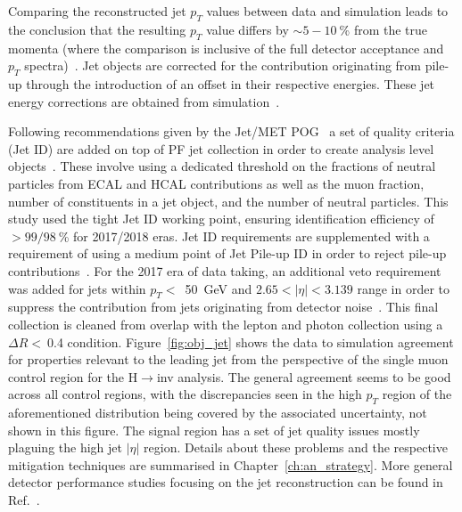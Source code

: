 \hspace{10pt} Comparing the reconstructed jet $p_T$ values between data and simulation leads to the conclusion that the resulting $p_T$ value differs by $\sim 5-10~$\% from the true momenta (where the comparison is inclusive of the full detector acceptance and $p_T$ spectra)~\cite{note:AN_19_257}. Jet objects are corrected for the contribution originating from pile-up through the introduction of an offset in their respective energies. These jet energy corrections are obtained from simulation~\cite{note:AN_19_257,paper_jes_jer,twiki_jes_jer}.

\hspace{10pt} Following recommendations given by the Jet/MET POG~\cite{twiki_jet_met} a set of quality criteria (Jet ID) are added on top of PF jet collection in order to create analysis level objects~\cite{twiki_jet_id}. These involve using a dedicated threshold on the fractions of neutral particles from ECAL and HCAL contributions as well as the muon fraction, number of constituents in a jet object, and the number of neutral particles. This study used the tight Jet ID working point, ensuring identification efficiency of $>99/98~$\% for 2017/2018 eras. Jet ID requirements are supplemented with a requirement of using a medium point of Jet Pile-up ID in order to reject pile-up contributions~\cite{twiki_jet_pileupid}. For the 2017 era of data taking, an additional veto requirement was added for jets within $p_T<$~50~GeV and $2.65<|\eta|<3.139$ range in order to suppress the contribution from jets originating from detector noise~\cite{note:AN_19_257}. This final collection is cleaned from overlap with the lepton and photon collection using a $\Delta R<~$0.4 condition. Figure~\ref{fig:obj_jet} shows the data to simulation agreement for properties relevant to the leading jet from the perspective of the single muon control region for the H$\rightarrow$inv analysis. The general agreement seems to be good across all control regions, with the discrepancies seen in the high $p_{T}$ region of the aforementioned distribution being covered by the associated uncertainty, not shown in this figure. The signal region has a set of jet quality issues mostly plaguing the high jet $|\eta|$ region. Details about these problems and the respective mitigation techniques are summarised in Chapter~\ref{ch:an_strategy}. More general detector performance studies focusing on the jet reconstruction can be found in Ref.~\cite{paper:jet_perf}.

